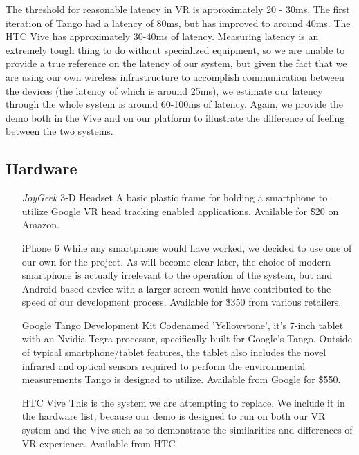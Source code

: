 \documentclass{report}
\begin{document}
	The threshold for reasonable latency in VR is approximately 20 - 30ms. The first iteration of Tango had a latency of 80ms, but has improved to around 40ms. The HTC Vive has approximately 30-40ms of latency. Measuring latency is an extremely tough thing to do without specialized equipment, so we are unable to provide a true reference  on the latency of our system, but given the fact that we are using our own wireless infrastructure to accomplish communication between the devices (the latency of which is around 25ms), we estimate our latency through the whole system is around 60-100ms of latency. Again, we provide the demo both in the Vive and on our platform to illustrate the difference of feeling between the two systems.
	
	\subsection*{Hardware}
	\begin{itemize}
		\item[\textit{JoyGeek} 3-D Headset] A basic plastic frame for holding a smartphone to utilize Google VR head tracking enabled applications. Available for \~\$20 on Amazon.
		\item[iPhone 6] While any smartphone would have worked, we decided to use one of our own for the project. As will become clear later, the choice of modern smartphone is actually irrelevant to the operation of the system, but and Android based device with a larger screen would have contributed to the speed of our development process. Available for \~\$350 from various retailers.
		\item[Google Tango Development Kit] Codenamed 'Yellowstone', it's 7-inch tablet with an Nvidia Tegra processor, specifically built for Google's Tango. Outside of typical smartphone/tablet features, the tablet also includes the novel infrared and optical sensors required to perform the environmental measurements Tango is designed to utilize. Available from Google for \~\$550.
		\item[HTC Vive] This is the system we are attempting to replace. We include it in the hardware list, because our demo is designed to run on both our VR system and the Vive such as to demonstrate the similarities and differences of VR experience. Available from HTC 
	\end{itemize}
	
\end{document}
